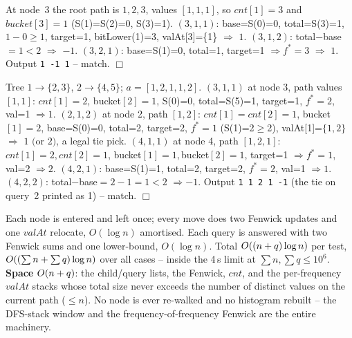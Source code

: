 \begin{tracebox}
At node~3 the root path is \(1,2,3\), values \([1,1,1]\), so \(\mathit{cnt}[1]=3\) and
\(\mathit{bucket}[3]=1\) (S(1)=S(2)=0, S(3)=1). \((3,1,1)\): base=S(0)=0, total=S(3)=1,
\(1{-}0\ge1\), target=1, bitLower(1)=3, valAt[3]=\{1\} \(\Rightarrow\) \(\boxed{1}\).
\((3,1,2)\): total\(-\)base\(=1<2\) \(\Rightarrow\) \(\boxed{-1}\). \((3,2,1)\): base=S(1)=0,
total=1, target=1 \(\Rightarrow f^\ast=3\) \(\Rightarrow\) \(\boxed{1}\). Output
\texttt{1 -1 1} -- match. \(\Box\)
\end{tracebox}

\begin{tracebox}
Tree \(1\!\to\!\{2,3\}\), \(2\!\to\!\{4,5\}\); \(a=[1,2,1,1,2]\).
\((3,1,1)\) at node 3, path values \([1,1]\): \(\mathit{cnt}[1]=2\), bucket\([2]=1\),
S(0)=0, total=S(5)=1, target=1, \(f^\ast=2\), val=1 \(\Rightarrow\boxed{1}\).
\((2,1,2)\) at node 2, path \([1,2]\): \(\mathit{cnt}[1]=\mathit{cnt}[2]=1\),
bucket\([1]=2\), base=S(0)=0, total=2, target=2, \(f^\ast=1\) (S(1)=2\(\ge\)2),
valAt[1]=\(\{1,2\}\) \(\Rightarrow\) \(\boxed{1\text{ (or }2\text{)}}\), a legal tie pick.
\((4,1,1)\) at node 4, path \([1,2,1]\): \(\mathit{cnt}[1]=2,\mathit{cnt}[2]=1\),
bucket\([1]=1,\)bucket\([2]=1\), target=1 \(\Rightarrow f^\ast=1\), val=2 \(\Rightarrow\boxed{2}\).
\((4,2,1)\): base=S(1)=1, total=2, target=2, \(f^\ast=2\), val=1 \(\Rightarrow\boxed{1}\).
\((4,2,2)\): total\(-\)base\(=2-1=1<2\) \(\Rightarrow\boxed{-1}\). Output
\texttt{1 1 2 1 -1} (the tie on query~2 printed as 1) -- match. \(\Box\)
\end{tracebox}

\begin{complexitybox}
Each node is entered and left once; every move does two Fenwick updates and one
\(\mathit{valAt}\) relocate, \(O(\log n)\) amortised. Each query is answered with two
Fenwick sums and one lower-bound, \(O(\log n)\). Total \(O((n+q)\log n)\) per test,
\(O((\sum n+\sum q)\log n)\) over all cases -- inside the 4\,s limit at
\(\sum n,\sum q\le10^6\). \textbf{Space} \(O(n+q)\): the child/query lists, the
Fenwick, \(\mathit{cnt}\), and the per-frequency \(\mathit{valAt}\) stacks whose total
size never exceeds the number of distinct values on the current path (\(\le n\)). No node
is ever re-walked and no histogram rebuilt -- the DFS-stack window and the
frequency-of-frequency Fenwick are the entire machinery.
\end{complexitybox}

